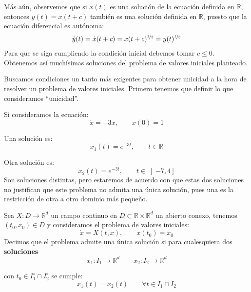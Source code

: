 \begin{ejemplo}
    \noindent
    Más aún, observemos que si $x(t)$ es una solución de la ecuación definida en $\mathbb{R}$, entonces $y(t) = x(t+c)$ también es una solución definida en $\mathbb{R}$, puesto que la ecuación diferencial es autónoma:
    \begin{equation*}
        \dot{y}(t) = \dot{x}(t+c) = x( t+c )^{\nicefrac{1}{3}} = y(t)^{\nicefrac{1}{3}}
    \end{equation*}
    Para que se siga cumpliendo la condición inicial debemos tomar $c\leq 0$.\\

    \noindent
    Obtenemos así muchísimas soluciones del problema de valores iniciales planteado.
\end{ejemplo}

\noindent
Buscamos condiciones un tanto más exigentes para obtener unicidad a la hora de resolver un problema de valores iniciales. Primero tenemos que definir lo que consideramos ``unicidad''.

\begin{ejemplo}
    Si consideramos la ecuación:
    \begin{equation*}
        \dot{x} = -3x, \qquad x(0) = 1
    \end{equation*}

    Una solución es:
    \begin{equation*}
        x_1(t) = e^{-3t}, \qquad t\in \mathbb{R}
    \end{equation*}

    Otra solución es:
    \begin{equation*}
        x_2(t) = e^{-3t}, \qquad t\in \left]-7,4\right]
    \end{equation*}
    Son soluciones distintas, pero estaremos de acuerdo con que estas dos soluciones no justifican que este problema no admita una única solución, pues una es la restricción de otra a otro dominio más pequeño.
\end{ejemplo}

\begin{definicion}
    Sea $X:D\to \mathbb{R}^d$ un campo continuo en $D\subset \mathbb{R}\times \mathbb{R}^d$ un abierto conexo, tenemos $(t_0,x_0)\in D$ y consideramos el problema de valores iniciales:
    \begin{equation*}
        \dot{x} = X(t,x), \qquad x(t_0) = x_0
    \end{equation*}
    Decimos que el problema admite una única solución si para cualesquiera dos \textbf{soluciones} 
    \begin{equation*}
        x_1:I_1\to \mathbb{R}^d \qquad 
        x_2:I_2\to \mathbb{R}^d 
    \end{equation*}

    con $t_0 \in I_1^\circ\cap I_2^\circ$ se cumple:
    \begin{equation*}
        x_1(t) = x_2(t) \qquad \forall t\in I_1\cap I_2
    \end{equation*}
\end{definicion}

